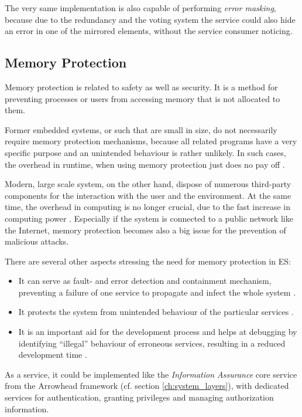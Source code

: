 The very same implementation is also capable of performing \emph{error masking}, because due to the redundancy and the voting system the service could also hide an error in one of the mirrored elements, without the service consumer noticing.


\subsection{Memory Protection}
Memory protection is related to safety as well as security. It is a method for preventing processes or users from accessing memory that is not allocated to them.

Former embedded systems, or such that are small in size, do not necessarily require memory protection mechanisms, because all related programs have a very specific purpose and an unintended behaviour is rather unlikely. In such cases, the overhead in runtime, when using memory protection just does no pay off \cite{yamada2008}. 

Modern, large scale system, on the other hand, dispose of numerous third-party components for the interaction with the user and the environment. At the same time, the overhead in computing is no longer crucial, due to the fast increase in computing power  \cite{yamada2008}. Especially if the system is connected to a public network like the Internet, memory protection becomes also a big issue for the prevention of malicious attacks.

There are several other aspects stressing the need for memory protection in ES:

\begin{itemize}
\item It can serve as fault- and error detection and containment mechanism, preventing a failure of one service to propagate and infect the whole system \cite{yamada2008}.
\item It protects the system from unintended behaviour of the particular services \cite{yamada2014}.
\item It is an important aid for the development process and helps at debugging by identifying ``illegal'' behaviour of erroneous services, resulting in a reduced development time \cite{yamada2008} \cite{yamada2014}.
\end{itemize}

As a service, it could be implemented like the \emph{Information Assurance} core service from the Arrowhead framework (cf. section \ref{ch:system_layers}), with dedicated services for authentication, granting privileges and managing authorization information.


